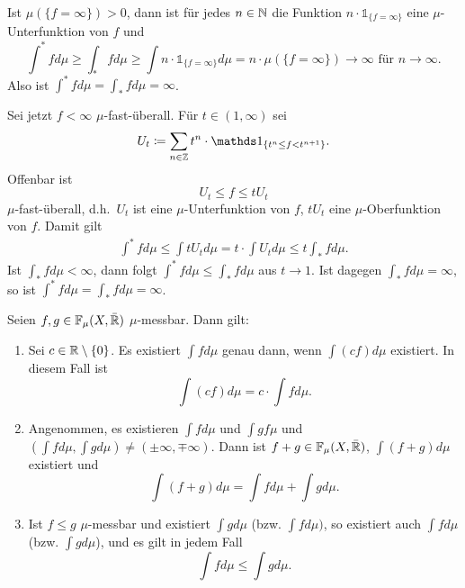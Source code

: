 \documentclass[a4paper,twoside,DIV15,BCOR12mm]{scrbook}
\newcommand{\ind}{\mathds 1}
\begin{document}
\begin{beweis}
Ist $\mu(\{f=\infty\})>0$, dann ist für jedes $n\in\mathbb{N}$ die Funktion $n\cdot \ind_{\{f=\infty\}}$ eine $\mu$-Unterfunktion von $f$ und 
\[
\int^*fd\mu \ge \int_* fd\mu \ge \int n \cdot\ind_{\{f=\infty\}} d\mu = n \cdot \mu(\{f=\infty\})\to \infty\text{ für }n\to\infty.
\]
Also ist $\int^* fd\mu = \int_* fd\mu = \infty$.

Sei jetzt $f<\infty$ $\mu$-fast-überall. Für $t\in(1,\infty)$ sei
\[
U_t \da \sum_{n\in\MdZ} t^n \cdot \ind_{\{t^n \le f < t^{n+1}\}}. 
\]
Offenbar ist
$$
U_t\le f\le t U_t
$$
$\mu$-fast-überall, d.h.\ 
$U_t$ ist eine $\mu$-Unterfunktion von $f$, $tU_t$ eine $\mu$-Oberfunktion von $f$. Damit gilt
\begin{align*}
\int^* fd\mu \le \int t U_t d\mu = t \cdot \int U_t d\mu \le t \int_* f d \mu.
\end{align*}
Ist $\int_* fd\mu <\infty$, dann folgt $\int^* fd\mu \le \int_* fd\mu$ aus $t\to 1$. Ist dagegen $\int_* fd\mu = \infty$, so ist $\int^* fd\mu = \int_* fd\mu = \infty$.
\end{beweis}



\begin{satz}
\label{satz1.13}
Seien $f,g\in\mathbb F_\mu(X,\bar{\mathbb{R}})$ $\mu$-messbar. Dann gilt:
\begin{enumerate}
\item Sei $c\in \mathbb{R}\setminus\{0\}$. Es existiert $\int fd\mu$ genau dann, wenn $\int(cf)d\mu$ existiert. In diesem Fall ist 
\[
\int (cf) d\mu = c \cdot \int fd\mu.
\]
\item Angenommen, es existieren $\int fd \mu$ und $\int gf\mu$ und $(\int fd\mu, \int gd\mu) \ne (\pm \infty, \mp \infty)$. Dann ist $f+g\in \mathbb F_\mu(X,\bar{\mathbb{R}})$, $\int(f+g)d\mu$ existiert und
\[
\int (f+g)d\mu = \int fd\mu + \int gd\mu.
\]
\item Ist $f\le g$ $\mu$-messbar und existiert $\int gd\mu$ (bzw. $\int fd\mu)$, so existiert auch $\int fd\mu$ (bzw. $\int gd\mu$), und es gilt in jedem Fall
\[
\int fd\mu \le \int gd\mu.
\]
\end{enumerate}
\end{satz}
\end{document}
